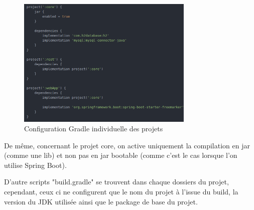 			\begin{figure}[H]
				\centering\includegraphics[width=0.75\textwidth, keepaspectratio]{res/gradle_project.png}
				\caption{Configuration Gradle individuelle des projets}
			\end{figure}

			De même, concernant le projet core, on active uniquement la compilation en jar (comme une lib) et non pas en jar bootable (comme c'est le cas lorsque l'on utilise Spring Boot).

			D'autre scripts "build.gradle" se trouvent dans chaque dossiers du projet, cependant, ceux ci ne configurent que le nom du projet à l'issue du build, la version du JDK utilisée ainsi que le package de base du projet.
